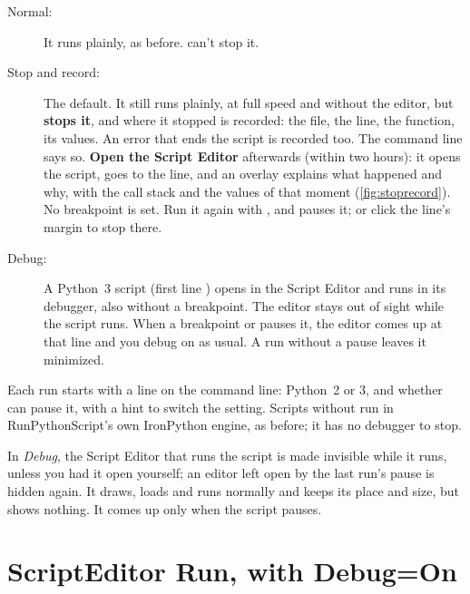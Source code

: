 \begin{description}
  \item[Normal:] It runs plainly, as before.  can't stop it.
  \item[Stop and record:] The default. It still runs plainly, at full speed and without the editor, but
        \textbf{ stops it}, and where it stopped is recorded: the file, the line, the
        function, its values. An error that ends the script is recorded too. The command line says so.
        \textbf{Open the Script Editor} afterwards (within two hours): it opens the script, goes to the line,
        and an overlay explains what happened and why, with the call stack and the values of that moment
        (\cref{fig:stoprecord}). No breakpoint is set. Run it again with , and 
        pauses it; or click the line's margin to stop there.
  \item[Debug:] A Python~3 script (first line ) opens in the Script Editor and runs in its
        debugger, also without a breakpoint. The editor stays out of sight while the script runs. When a
        breakpoint or  pauses it, the editor comes up at that line and you debug on as
        usual. A run without a pause leaves it minimized.
\end{description}


Each run starts with a line on the command line: Python~2 or 3, and whether  can pause it,
with a hint to switch the setting. Scripts without  run in RunPythonScript's own IronPython
engine, as before; it has no debugger to stop.

\begin{note}
In \emph{Debug}, the Script Editor that runs the script is made invisible while it runs, unless you had it
open yourself; an editor left open by the last run's pause is hidden again. It draws, loads and runs
normally and keeps its place and size, but shows nothing. It comes up only when the script pauses.
\end{note}

\section{ScriptEditor Run, with Debug=On}\label{sec:scripteditorrun}

